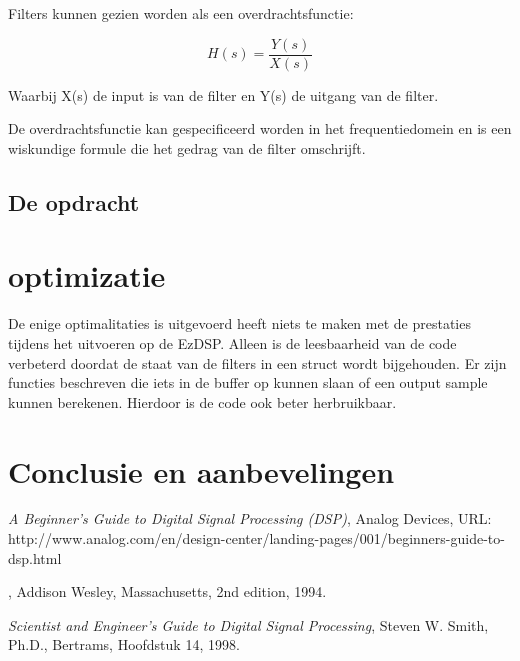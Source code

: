 \documentclass[11pt,a4paper]{article}
\begin{document}
Filters kunnen gezien worden als een overdrachtsfunctie:
 
\[
    H(s) = \frac{Y(s)}{X(s)}
\]	

Waarbij X(s) de input is van de filter en Y(s) de uitgang van de filter. 

De overdrachtsfunctie kan gespecificeerd worden in het frequentiedomein en is een wiskundige formule die het gedrag van de filter omschrijft. 

		
		\subsection{De opdracht}		
		
	
	

	\section{optimizatie}
	De enige optimalitaties is uitgevoerd heeft niets te maken met de prestaties tijdens het uitvoeren op de EzDSP. Alleen is de leesbaarheid van de code verbeterd doordat de staat van de filters in een struct wordt bijgehouden. Er zijn functies beschreven die iets in de buffer op kunnen slaan of een output sample kunnen berekenen. Hierdoor is de code ook beter herbruikbaar. 
	

	\section{Conclusie en aanbevelingen}
	
	
	
		
	\begin{thebibliography}{9}

  		
  		\textit{A Beginner's Guide to Digital Signal Processing (DSP)},
  		Analog Devices,
  		URL: http://www.analog.com/en/design-center/landing-pages/001/beginners-guide-to-dsp.html 

	
	\bibitem{}
  		
  		\textit{},
  		Addison Wesley, Massachusetts,
  		2nd edition,
  		1994.
  		
  		
  		\textit{Scientist and Engineer's Guide to Digital Signal Processing},
  		Steven W. Smith, Ph.D., 
  		Bertrams,
  		Hoofdstuk 14,
  		1998.  		
		
	\end{thebibliography}
\end{document}
